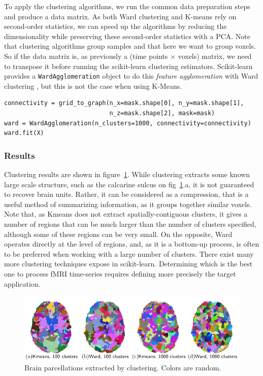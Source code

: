 \documentclass{frontiersSCNS} %
\begin{document}
To apply the clustering algorithms, we run the common data preparation
steps and produce a data matrix. As both Ward clustering and K-means rely
on second-order statistics, we can speed up the algorithms by reducing
the dimensionality while preserving these second-order statistics with a
PCA. Note that clustering algorithms group samples and that here we want
to group voxels. So if the data matrix is, as previously a (time points
$\times$ voxels) matrix, we need to transpose it before running the
scikit-learn clustering estimators. Scikit-learn provides a
\texttt{WardAgglomeration} object to do this \emph{feature agglomeration}
with Ward clustering \citep{michel2012supervisedclustering}, but this is
not the case when using K-Means.

\begin{lstlisting}
connectivity = grid_to_graph(n_x=mask.shape[0], n_y=mask.shape[1],
                             n_z=mask.shape[2], mask=mask)
ward = WardAgglomeration(n_clusters=1000, connectivity=connectivity)
ward.fit(X)
\end{lstlisting}

\subsubsection{Results}

Clustering results are shown in figure~\ref{fig:clustering}. While
clustering extracts some known large scale structure, such as the
calcarine sulcus on fig~\ref{fig:clustering}.a, it is not guaranteed to
recover brain units. Rather, it can be considered as a compression, that
is a useful method of summarizing information, as it groups together
similar voxels. Note that, as Kmeans does not extract spatially-contiguous
clusters, it gives a number of regions that can be much larger than the
number of clusters specified, although some of these regions can be very
small. On the opposite, Ward operates directly at the level of regions,
and, as it is a bottom-up process, is often to be preferred when working
with a large number of clusters. There exist many more clustering
techniques expose in scikit-learn. Determining which is the best one to
process fMRI time-series requires defining more precisely the target
application.

\begin{figure}[hbtp]
  \includegraphics[width=\linewidth]{img/clustering/figure}
  \caption{Brain parcellations extracted by clustering. Colors are
random.}
  \label{fig:clustering}
\end{figure}
\end{document}
